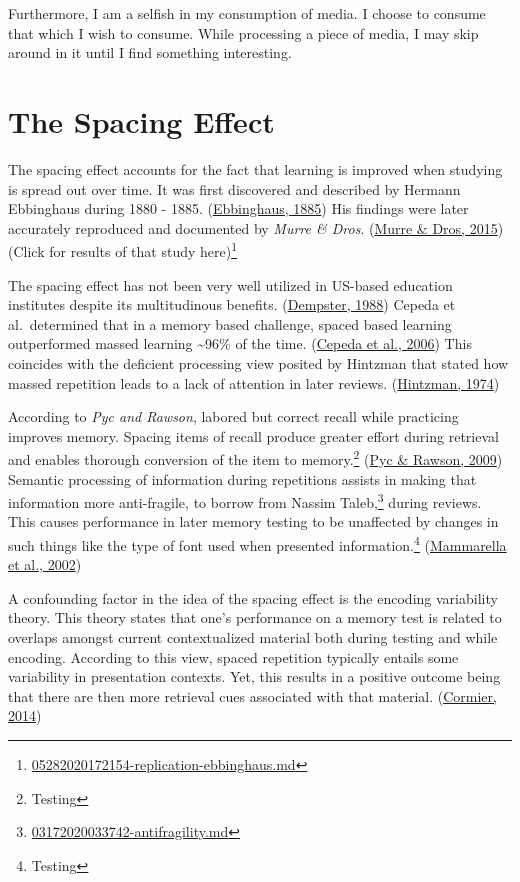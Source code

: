 \documentclass[
  notoc %
]{tufte-book}
\DeclareRobustCommand{\href}[2]{#2\footnote{\url{#1}}}
\begin{document}
Furthermore, I am a selfish in my consumption of media. I choose to
consume that which I wish to consume. While processing a piece of media,
I may skip around in it until I find something interesting.

\hypertarget{sec:spacing-effect}{%
\section{The Spacing Effect}\label{sec:spacing-effect}}

The spacing effect accounts for the fact that learning is improved when
studying is spread out over time. It was first discovered and described
by Hermann Ebbinghaus during 1880 - 1885.
(\protect\hyperlink{ref-ebbinghaus1885ueber}{Ebbinghaus, 1885}) His
findings were later accurately reproduced and documented by \emph{Murre
\& Dros}.
(\protect\hyperlink{ref-murreReplicationAnalysisEbbinghaus2015}{Murre \&
Dros, 2015}) \href{05282020172154-replication-ebbinghaus.md}{(Click for
results of that study here)}

The spacing effect has not been very well utilized in US-based education
institutes despite its multitudinous benefits.
(\protect\hyperlink{ref-dempsterCaseStudyFailure1988}{Dempster, 1988})
Cepeda et al.~determined that in a memory based challenge, spaced based
learning outperformed massed learning \textasciitilde96\% of the time.
(\protect\hyperlink{ref-cepeda2006distributed}{Cepeda et al., 2006})
This coincides with the deficient processing view posited by Hintzman
that stated how massed repetition leads to a lack of attention in later
reviews. (\protect\hyperlink{ref-hintzman1974theoretical}{Hintzman,
1974})

According to \emph{Pyc and Rawson}, labored but correct recall while
practicing improves memory. Spacing items of recall produce greater
effort during retrieval and enables thorough conversion of the item to
memory.\footnote{Testing} (\protect\hyperlink{ref-pyc2009testing}{Pyc \&
Rawson, 2009}) Semantic processing of information during repetitions
assists in making that information more
\href{03172020033742-antifragility.md}{anti-fragile, to borrow from
Nassim Taleb,} during reviews. This causes performance in later memory
testing to be unaffected by changes in such things like the type of font
used when presented information.\footnote{Testing}
(\protect\hyperlink{ref-mammarella2002spacing}{Mammarella et al., 2002})

A confounding factor in the idea of the spacing effect is the encoding
variability theory. This theory states that one's performance on a
memory test is related to overlaps amongst current contextualized
material both during testing and while encoding. According to this view,
spaced repetition typically entails some variability in presentation
contexts. Yet, this results in a positive outcome being that there are
then more retrieval cues associated with that material.
(\protect\hyperlink{ref-cormier2014basic}{Cormier, 2014})
\end{document}
